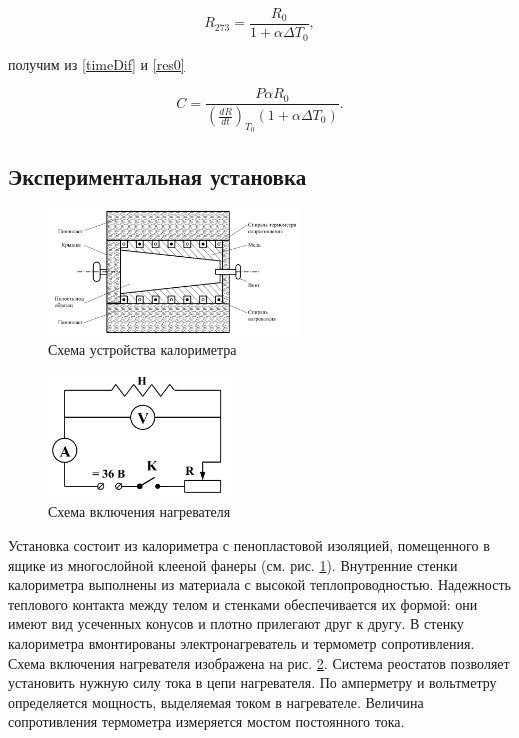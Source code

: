\documentclass[a4paper,12pt]{article} %
\begin{document}
\begin{equation}
    R_{273} = \frac{R_0}{1 + \alpha \Delta T_0},
    \label{res0}
\end{equation}

получим из \eqref{timeDif} и \eqref{res0}

\begin{equation}
    C = \frac{P\alpha R_0}{(\frac{dR}{dt})_{T_0}(1 + \alpha \Delta T_0)}.
    \label{final}
\end{equation}

\subsection{Экспериментальная установка}

\begin{figure}
    \centering
    \includegraphics[width = 0.6\textwidth]{setup.PNG}
    \caption{Схема устройства калориметра}
    \label{fig:setup}
\end{figure}

\begin{figure}
    \centering
    \includegraphics[width = 0.45\textwidth]{circuit.PNG}
    \caption{Схема включения нагревателя}
    \label{fig:circuit}
\end{figure}

Установка состоит из калориметра с пенопластовой изоляцией, помещенного в ящике из многослойной клееной фанеры (см. рис. \ref{fig:setup}). Внутренние стенки калориметра выполнены из материала с высокой теплопроводностью. Надежность теплового контакта между телом и стенками обеспечивается их формой: они имеют вид усеченных конусов и плотно прилегают друг к другу. В стенку калориметра вмонтированы электронагреватель и термометр сопротивления. Схема включения нагревателя изображена на рис. \ref{fig:circuit}. Система реостатов позволяет установить нужную силу тока в цепи нагревателя. По амперметру и вольтметру определяется мощность, выделяемая током в нагревателе. Величина сопротивления термометра измеряется мостом постоянного тока.
\end{document}
